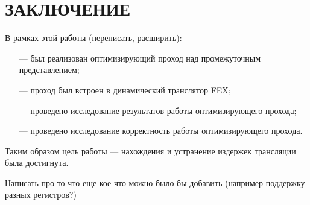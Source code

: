 \section*{ЗАКЛЮЧЕНИЕ}

В рамках этой работы (переписать, расширить):
\begin{itemize}[leftmargin=1.6\parindent]
	\item [---] был реализован оптимизирующий проход над промежуточным представлением;
	\item [---] проход был встроен в динамический транслятор FEX;
	\item [---] проведено исследование результатов работы оптимизирующего прохода;
	\item [---] проведено исследование корректность работы оптимизирующего прохода.
\end{itemize}

Таким образом цель работы --- нахождения и устранение издержек трансляции была достигнута.

Написать про то что еще кое-что можно было бы добавить (например поддержку разных регистров?)

\pagebreak